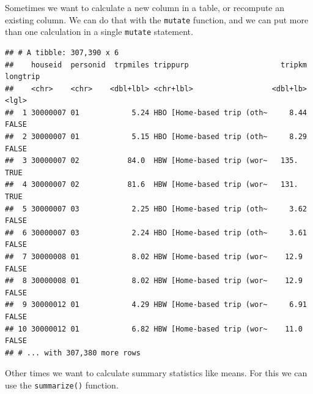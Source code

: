 \documentclass[]{book}
\newenvironment{Shaded}{\begin{snugshade}}{\end{snugshade}}
\newcommand{\CommentTok}[1]{\textcolor[rgb]{0.56,0.35,0.01}{\textit{#1}}}
\newcommand{\DataTypeTok}[1]{\textcolor[rgb]{0.13,0.29,0.53}{#1}}
\newcommand{\DecValTok}[1]{\textcolor[rgb]{0.00,0.00,0.81}{#1}}
\newcommand{\FloatTok}[1]{\textcolor[rgb]{0.00,0.00,0.81}{#1}}
\newcommand{\KeywordTok}[1]{\textcolor[rgb]{0.13,0.29,0.53}{\textbf{#1}}}
\newcommand{\NormalTok}[1]{#1}
\newcommand{\OperatorTok}[1]{\textcolor[rgb]{0.81,0.36,0.00}{\textbf{#1}}}
\newcommand{\OtherTok}[1]{\textcolor[rgb]{0.56,0.35,0.01}{#1}}
\newcommand{\StringTok}[1]{\textcolor[rgb]{0.31,0.60,0.02}{#1}}
\begin{document}
Sometimes we want to calculate a new column in a table, or recompute an
existing column. We can do that with the \texttt{mutate} function, and we can
put more than one calculation in a single \texttt{mutate} statement.

\begin{Shaded}
\end{Shaded}

\begin{verbatim}
## # A tibble: 307,390 x 6
##    houseid  personid  trpmiles trippurp                     tripkm longtrip
##    <chr>    <chr>    <dbl+lbl> <chr+lbl>                  <dbl+lb> <lgl>   
##  1 30000007 01            5.24 HBO [Home-based trip (oth~     8.44 FALSE   
##  2 30000007 01            5.15 HBO [Home-based trip (oth~     8.29 FALSE   
##  3 30000007 02           84.0  HBW [Home-based trip (wor~   135.   TRUE    
##  4 30000007 02           81.6  HBW [Home-based trip (wor~   131.   TRUE    
##  5 30000007 03            2.25 HBO [Home-based trip (oth~     3.62 FALSE   
##  6 30000007 03            2.24 HBO [Home-based trip (oth~     3.61 FALSE   
##  7 30000008 01            8.02 HBW [Home-based trip (wor~    12.9  FALSE   
##  8 30000008 01            8.02 HBW [Home-based trip (wor~    12.9  FALSE   
##  9 30000012 01            4.29 HBW [Home-based trip (wor~     6.91 FALSE   
## 10 30000012 01            6.82 HBW [Home-based trip (wor~    11.0  FALSE   
## # ... with 307,380 more rows
\end{verbatim}

Other times we want to calculate summary statistics like means.
For this we can use the \texttt{summarize()} function.

\begin{Shaded}
\end{Shaded}
\end{document}
